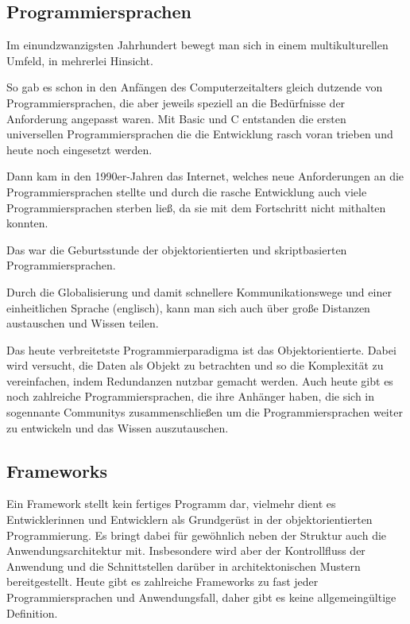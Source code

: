 \subsection{Programmiersprachen}
Im einundzwanzigsten Jahrhundert bewegt man sich in einem multikulturellen 
Umfeld, in mehrerlei Hinsicht.

So gab es schon in den Anfängen des Computerzeitalters gleich dutzende 
von Programmiersprachen, die aber jeweils speziell an die Bedürfnisse der 
Anforderung angepasst waren. Mit Basic und C entstanden die ersten universellen
Programmiersprachen die die Entwicklung rasch voran trieben und heute 
noch eingesetzt werden.

Dann kam in den 1990er-Jahren das Internet, welches neue Anforderungen
an die Programmiersprachen stellte und durch die rasche Entwicklung auch 
viele Programmiersprachen sterben ließ, da sie mit dem Fortschritt 
nicht mithalten konnten.

Das war die Geburtsstunde der objektorientierten und skriptbasierten 
Programmiersprachen.

Durch die Globalisierung und damit schnellere Kommunikationswege und 
einer einheitlichen Sprache (englisch), kann man sich auch über große 
Distanzen austauschen und Wissen teilen.

Das heute verbreitetste Programmierparadigma ist das Objektorientierte.
Dabei wird versucht, die Daten als Objekt zu betrachten und so die 
Komplexität zu vereinfachen, indem Redundanzen nutzbar gemacht werden.
Auch heute gibt es noch zahlreiche Programmiersprachen, die ihre Anhänger
haben, die sich in sogennante Communitys zusammenschließen um die 
Programmiersprachen weiter zu entwickeln und das Wissen auszutauschen.

\subsection{Frameworks} 
Ein Framework stellt kein fertiges Programm dar, vielmehr dient es 
Entwicklerinnen und Entwicklern als Grundgerüst in der 
objektorientierten Programmierung. Es bringt dabei für gewöhnlich neben 
der Struktur auch die Anwendungsarchitektur mit. Insbesondere wird 
aber der Kontrollfluss der Anwendung und die Schnittstellen darüber
in architektonischen Mustern bereitgestellt. 
Heute gibt es zahlreiche Frameworks zu fast jeder Programmiersprachen und
Anwendungsfall, daher gibt es keine allgemeingültige Definition.   

